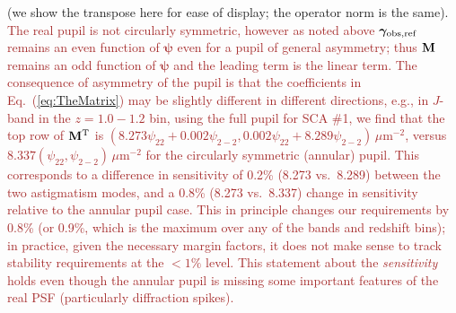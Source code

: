 \documentclass[usenatbib]{mnras}
\newcommand{\changetext}[1]{\textcolor{brown}{#1}}
\begin{document}
(we show the transpose here for ease of display; the operator norm is the same). \changetext{The real pupil is not circularly symmetric, however as noted above ${\boldsymbol\gamma}_{\rm obs,ref}$ remains an even function of ${\boldsymbol\psi}$ even for a pupil of general asymmetry; thus ${\bf M}$ remains an odd function of ${\boldsymbol\psi}$ and the leading term is the linear term. The consequence of asymmetry of the pupil is that the coefficients in Eq.~(\ref{eq:TheMatrix}) may be slightly different in different directions, e.g., in $J$-band in the $z=1.0-1.2$ bin, using the full pupil for SCA \#1, we find that the top row of ${\bf M}^{\rm T}$ is $(8.273\psi_{22}+0.002\psi_{2-2}, 0.002\psi_{22}+8.289\psi_{2-2})\,\mu$m$^{-2}$, versus $8.337(\psi_{22},\psi_{2-2})\,\mu$m$^{-2}$ for the circularly symmetric (annular) pupil. This corresponds to a difference in sensitivity of 0.2\% (8.273 vs.\ 8.289) between the two astigmatism modes, and a 0.8\% (8.273 vs.\ 8.337) change in sensitivity relative to the annular pupil case. This in principle changes our requirements by 0.8\% (or 0.9\%, which is the maximum over any of the bands and redshift bins); in practice, given the necessary margin factors, it does not make sense to track stability requirements at the $<1\%$ level. This statement about the {\em sensitivity} holds even though the annular pupil is missing some important features of the real PSF (particularly diffraction spikes).}
\end{document}
